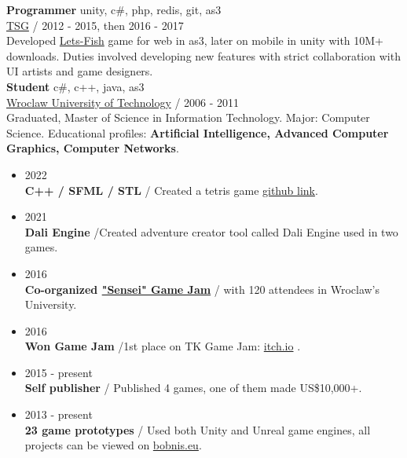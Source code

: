 \documentclass[12pt,a4paper]{article}
\begin{document}
\begin{multicols}{2}
	{\large \textbf{Programmer}} \hfill \textcolor{techColor}{unity, c\#, php, redis, git, as3} \\
	{\href{https://tensquaregames.com/}{TSG}}   /  2012 - 2015, then 2016 - 2017 \\
	Developed {\href{https://play.google.com/store/apps/details?id=air.com.tensquaregames.letsfish}{Lets-Fish}} game for web in as3, later on mobile in unity with 10M+ downloads. Duties involved developing new features with strict collaboration with UI artists and game designers. \\

	{\large \textbf{Student}} \hfill \textcolor{techColor}{c\#, c++, java, as3} \\
	{\href{https://pwr.edu.pl/en/}{Wroclaw University of Technology}}  / 2006 - 2011  \\
	Graduated, Master of Science in Information Technology. Major: Computer Science. Educational profiles: \textbf{Artificial Intelligence, Advanced Computer Graphics, Computer Networks}.



\begin{itemize}[leftmargin=7.0cm]
	\centering
	\section*{Mentions}
	\justifying
	\setlength\itemsep{0.0cm}
	\item[] \hfill 2022 \\
		\textbf{C++ / SFML / STL} / Created a tetris game {\href{https://github.com/kbobnis/tetris}{github link}}.
	\item[] \hfill 2021 \\
		\textbf{Dali Engine} /Created adventure creator tool called Dali Engine used in two games.
	\item[] \hfill 2016 \\
		\textbf{Co-organized {\href{https://www.facebook.com/events/1110429105711126}{"Sensei" Game Jam}}} / with 120 attendees in Wroclaw's University.
	\item[] \hfill 2016   \\
		\textbf{Won Game Jam} /1st place on TK Game Jam: {\href{https://itch.io/jam/tk-game-jam-2016/results}{itch.io}} .
	\item[]  \hfill 2015 - present \\
		 \textbf{Self publisher} / Published 4 games, one of them made US\$10,000+.
	\item[] \hfill 2013 - present\\
		 \textbf{23 game prototypes} / Used both Unity and Unreal game engines, all projects can be viewed on {\href{http://bobnis.eu}{bobnis.eu}}.
\end{itemize}


\end{multicols}
\end{document}
